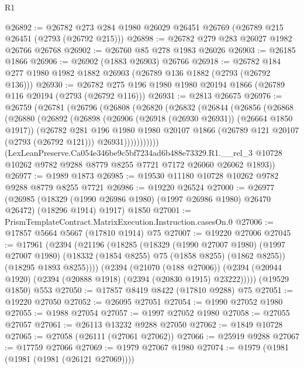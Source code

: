 \begin{lexlean}{R1}
\begin{coremodule}
@26892 := @26782 @273 @284 @1980 @26029 @26451 @26769 (@26789 @215 @26451 (@2793 (@26792 @215)))
@26898 := @26782 @279 @283 @26027 @1982 @26766 @26768
@26902 := @26760 @85 @278 @1983 @26026
@26903 := @26185 @1866
@26906 := @26902 (@1883 @26903) @26766
@26918 := @26782 @184 @277 @1980 @1982 @1882 @26903 (@26789 @136 @1882 (@2793 (@26792 @136)))
@26930 := @26782 @275 @196 @1980 @1980 @20194 @1866 (@26789 @116 @20194 (@2793 (@26792 @116)))
@26931 := @2813 @26675
@26976 := @26759
    (@26781
      (@26796
        (@26808
          (@26820
            (@26832
              (@26844
                (@26856
                  (@26868
                    (@26880
                      (@26892
                        (@26898
                          (@26906 (@26918 (@26930 @26931)) (@26664 @1850 @1917))
                          (@26782
                            @281
                            @196
                            @1980
                            @1980
                            @20107
                            @1866
                            (@26789 @121 @20107 (@2793 (@26792 @121)))
                            @26931)))))))))))
      (LexLeanPreserve.Ca054e346be9c5bf7234ad6b488e73329.R1.__rel_3
        @10728
        @10262
        @9782
        @9288
        @8779
        @8255
        @7721
        @7172
        @26060
        @26062
        @1893))
@26977 := @1989 @1873
@26985 := @19530 @11180 @10728 @10262 @9782 @9288 @8779 @8255 @7721
@26986 := @19220 @26524
@27000 := @26977
    (@26985 (@18329 (@1990 @26986 @1980) (@1997 @26986 @1980) @26470 @26472) (@18296 @1914) @1917)
    @1850
@27001 := PrismTemplateContract.MatrixExecution.Instruction.casesOn.{0}
@27006 := @17857 @5664 @5667 (@17810 @1914) @75
@27007 := @19220 @27006
@27045 := @17961
    (@2394
      (@21196
        (@18285
          (@18329
            (@1990 @27007 @1980)
            (@1997 @27007 @1980)
            (@18332 (@1854 @8255) @75 (@1858 @8255) (@1862 @8255))
            (@18295 @1893 @8255))))
      (@2394
        (@21070 (@188 @27006))
        (@2394 (@20944 @1920) (@2394 (@20888 @1918) (@2394 (@20830 @1915) @23222)))))
    (@19529 @1850)
    @553
@27050 := @17857 @8419 @8422 (@17810 @9288) @75
@27051 := @19220 @27050
@27052 := @26095 @27051
@27054 := @1990 @27052 @1980
@27055 := @1988 @27054
@27057 := @1997 @27052 @1980
@27058 := @27055 @27057
@27061 := @26113 @13232 @9288 @27050
@27062 := @1849 @10728
@27065 := @27058 (@26111 (@27061 @27062))
@27066 := @25919 @9288
@27067 := @17759 @27066
@27069 := @1979 @27067 @1980
@27074 := @1979 (@1981 (@1981 (@1981 (@26121 @27069))))

\end{coremodule}
\end{lexlean}
